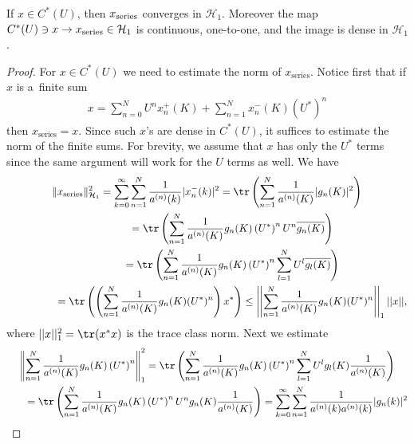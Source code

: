 \begin{prop}%
If $x\in C^*(U)$, then $x_{\rm series}$ converges in $\mathcal{H}_1$.
Moreover the map $C^*(U)\ni x\to x_{\rm series}\in \mathcal{H}_1$ is continuous, one-to-one, and the image is dense
in $\mathcal{H}_1$.
\end{prop}

\begin{proof}
For $x\in C^*(U)$ we need to estimate the norm of $x_\textrm{series}$.
Notice f\/irst that if $x$ is a~f\/inite sum
\begin{gather*}
x = \sum\limits_{n=0}^N U^n x_n^+(K) + \sum\limits_{n=1}^N x_n^-(K)(U^*)^n
\end{gather*}
then $x_{\textrm{series}} = x$.
Since such $x$'s are dense in $C^*(U)$, it suf\/f\/ices to estimate the norm of the f\/inite sums.
For brevity, we assume that $x$ has only the $U^*$ terms since the same argument will work for the $U$ terms as well.
We have
\begin{gather*}
\|x_{\textrm{series}}\|_{\mathcal{H}_1}^2 = \sum\limits_{k=0}^\infty \sum\limits_{n=1}^N
\frac{1}{a^{(n)}(k)}|x_n^-(k)|^2 = \tr\left(\sum\limits_{n=1}^N \frac{1}{a^{(n)}(K)}|g_n(K)|^2\right)
\\
\phantom{\|x_{\textrm{series}}\|_{\mathcal{H}_1}^2}
= \tr\left(\sum\limits_{n=1}^N \frac{1}{a^{(n)}(K)}g_n(K)\left(U^*\right)^nU^n\overline{g_n(K)}\right)
\\
\phantom{\|x_{\textrm{series}}\|_{\mathcal{H}_1}^2}
=\tr\left(\sum\limits_{n=1}^N \frac{1}{a^{(n)}(K)}g_n(K)\left(U^*\right)^n\sum\limits_{l=1}^NU^l\overline{g_l(K)}\right)
\\
\phantom{\|x_{\textrm{series}}\|_{\mathcal{H}_1}^2}
=\tr\left(\left(\sum\limits_{n=1}^N \frac{1}{a^{(n)}(K)}g_n(K)(U^*)^n\right)x^*\right)\leq
\left|\left|\sum\limits_{n=1}^N \frac{1}{a^{(n)}(K)}g_n(K)(U^*)^n\right|\right|_1||x||,
\end{gather*}
where $||x||^2_1=\tr(x^*x)$ is the trace class norm.
Next we estimate
\begin{gather*}
\left\|\sum\limits_{n=1}^N \frac{1}{a^{(n)}(K)}g_n(K)\left(U^*\right)^n\right\|_1^2 =
\tr\left(\sum\limits_{n=1}^N\frac{1}{a^{(n)}(K)}g_n(K)\left(U^*\right)^n\sum\limits_{l=1}^N
U^lg_l(K)\frac{1}{a^{(n)}(K)}\right)
\\
\qquad
=\tr\left(\sum\limits_{n=1}^N\frac{1}{a^{(n)}(K)}g_n(K)\left(U^*\right)^nU^n g_n(K)\frac{1}{a^{(n)}(K)}\right)
= \sum\limits_{k=0}^\infty \sum\limits_{n=1}^N \frac{1}{a^{(n)}(k)a^{(n)}(k)}|g_n(k)|^2
\\

\end{gather*}
\end{proof}

